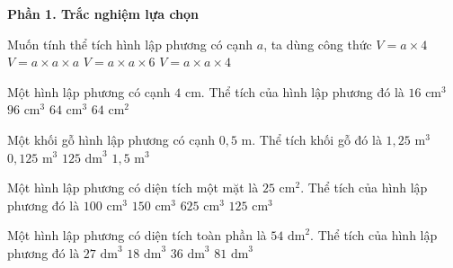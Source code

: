 \textbf{Phần 1. Trắc nghiệm lựa chọn}

\begin{ex} %
Muốn tính thể tích hình lập phương có cạnh $a$, ta dùng công thức
\choice
{$V = a \times 4$}
{\True $V = a \times a \times a$}
{$V = a \times a \times 6$}
{$V = a \times a \times 4$}
\end{ex}

\begin{ex} %
Một hình lập phương có cạnh $4\text{ cm}$. Thể tích của hình lập phương đó là
\choice
{$16\text{ cm}^3$}
{$96\text{ cm}^3$}
{\True $64\text{ cm}^3$}
{$64\text{ cm}^2$}
\end{ex}

\begin{ex} %
Một khối gỗ hình lập phương có cạnh $0{,}5\text{ m}$. Thể tích khối gỗ đó là
\choice
{$1{,}25\text{ m}^3$}
{\True $0{,}125\text{ m}^3$}
{$125\text{ dm}^3$}
{$1{,}5\text{ m}^3$}
\end{ex}

\begin{ex} %
Một hình lập phương có diện tích một mặt là $25\text{ cm}^2$. Thể tích của hình lập phương đó là
\choice
{$100\text{ cm}^3$}
{$150\text{ cm}^3$}
{$625\text{ cm}^3$}
{\True $125\text{ cm}^3$}
\end{ex}

\begin{ex} %
Một hình lập phương có diện tích toàn phần là $54\text{ dm}^2$. Thể tích của hình lập phương đó là
\choice
{\True $27\text{ dm}^3$}
{$18\text{ dm}^3$}
{$36\text{ dm}^3$}
{$81\text{ dm}^3$}
\end{ex}

